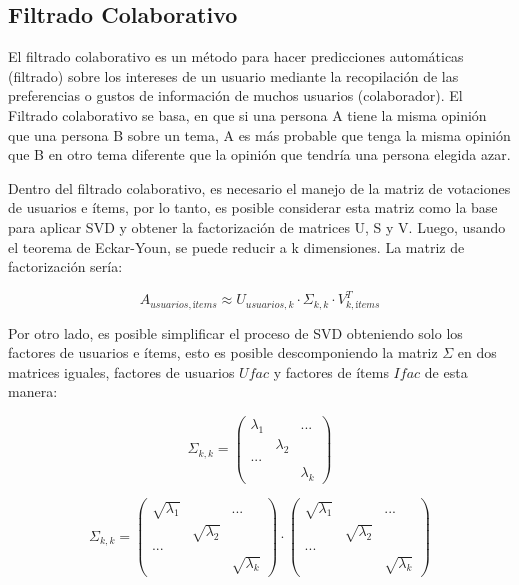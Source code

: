 \documentclass{article}
\begin{document}
\subsection{Filtrado Colaborativo}

El filtrado colaborativo es un método para hacer predicciones automáticas (filtrado) sobre los intereses de un usuario mediante la recopilación de las preferencias o gustos de información de muchos usuarios (colaborador). El Filtrado colaborativo se basa, en que si una persona A tiene la misma opinión que una persona B sobre un tema, A es más probable que tenga la misma opinión que B en otro tema diferente que la opinión que tendría una persona elegida azar. 

Dentro del filtrado colaborativo, es necesario el 
manejo de la matriz de votaciones de usuarios 
e ítems, por lo tanto, es posible considerar esta 
matriz como la base para aplicar SVD y obtener la 
factorización de matrices U, S y V. Luego, usando 
el teorema de Eckar-Youn, se puede reducir a k
dimensiones. La matriz de factorización sería:

$$ 
A_{usuarios, ítems} \approx U_{usuarios, k} \cdot \Sigma_{k, k} \cdot V^T_{k, ítems}
$$

Por otro lado, es posible simplificar 
el proceso de SVD obteniendo solo los 
factores de usuarios e ítems, esto es posible 
descomponiendo la matriz $\Sigma$ en dos matrices 
iguales, factores de usuarios $Ufac$ y factores de 
ítems $Ifac$ de esta manera:

$$
\Sigma_{k,k} = 
\left(
\begin{matrix}
\lambda_{1} &  & ...\\
& \lambda_{2}\\
... \\
& & \lambda_{k}
\end{matrix}
\right)
$$

$$
\Sigma_{k,k} = 
\left(
\begin{matrix}
\sqrt{\lambda_{1}} &  & ...\\
& \sqrt{\lambda_{2}}\\
... \\
& & \sqrt{\lambda_{k}}
\end{matrix}
\right) 
\cdot 
\left(
\begin{matrix}
\sqrt{\lambda_{1}} &  & ...\\
& \sqrt{\lambda_{2}}\\
... \\
& & \sqrt{\lambda_{k}}
\end{matrix}
\right)
$$
\end{document}
